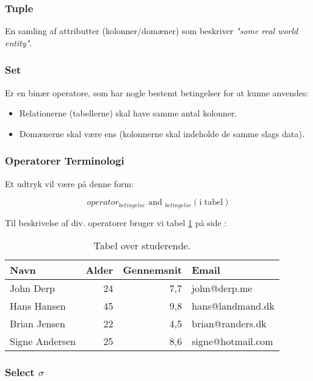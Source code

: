 \subsubsection{Tuple}
En samling af attributter (kolonner/domæner) som beskriver \textit{"some real world entity"}.

\subsubsection{Set}

Er en binær operatore, som har nogle bestemt betingelser for at kunne anvendes:

\begin{itemize}
	\item Relationerne (tabellerne) skal have samme antal kolonner.
	\item Domænerne skal være ens (kolonnerne skal indeholde de samme slags data).
\end{itemize}

\subsubsection{Operatorer Terminologi}

Et udtryk vil være på denne form:

\begin{equation*}
operator_{betingelse} \text{ and } _{betingelse} (\text{i tabel})
\end{equation*}

Til beskrivelse af div. operatorer bruger vi tabel \ref{tab:stud} på side \pageref{tab:stud}:

\begin{table}[H]
	\centering
	\begin{tabular}{lrrl}
		\toprule
		\textbf{Navn}	&\textbf{Alder}	&\textbf{Gennemsnit}&\textbf{Email}\\
		\midrule
		John Derp		& 24 			& 7,7	& john@derp.me			\\			
		Hans Hansen		& 45 			& 9,8	& hans@landmand.dk		\\			
		Brian Jensen	& 22 			& 4,5	& brian@randers.dk		\\			
		Signe Andersen	& 25 			& 8,6	& signe@hotmail.com		\\
		\bottomrule
	\end{tabular}
	\caption{Tabel over studerende.}
	\label{tab:stud}
\end{table}

\subsubsection{Select $\sigma$}

